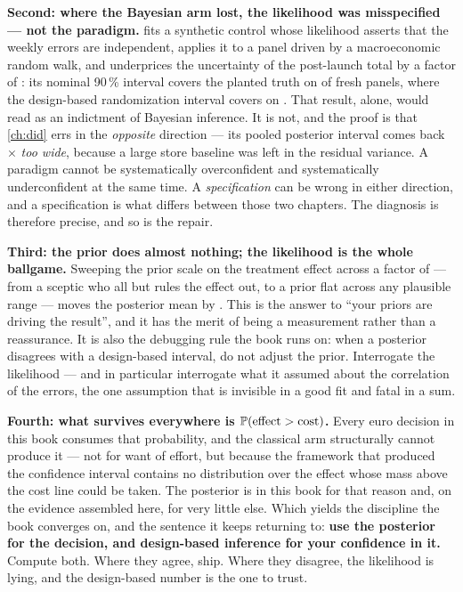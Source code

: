 \textbf{Second: where the Bayesian arm lost, the likelihood was misspecified --- not the
paradigm.}  fits a synthetic control whose likelihood asserts that the weekly
errors are independent, applies it to a panel driven by a macroeconomic random walk, and
underprices the uncertainty of the post-launch total by a factor of \nbSevenUnderprice: its
nominal 90\,\%
interval covers the planted truth on \pc{\nbSevenTotalCov} of fresh panels, where the
design-based randomization interval covers on \pc{\nbSevenRiCov}. That result, alone, would read
as an indictment of Bayesian inference. It is not, and the proof is that \cref{ch:did} errs in
the \emph{opposite} direction --- its pooled posterior interval comes back
\nbEightBayesOverCluster$\times$ \emph{too wide}, because a large store baseline was left in the
residual variance. A paradigm cannot be systematically overconfident and systematically
underconfident at the same time. A \emph{specification} can be wrong in either direction, and a
specification is what differs between those two chapters. The diagnosis is therefore precise,
and so is the repair.

\textbf{Third: the prior does almost nothing; the likelihood is the whole ballgame.} Sweeping the
prior scale on the treatment effect across a factor of \nbZeroPriorRatio{} --- from a sceptic who
all but rules the effect out, to a prior flat across any plausible range --- moves the posterior
mean by \eur{\nbZeroPriorShift}. This is the answer to ``your priors are driving the result'',
and it has the merit of being a measurement rather than a reassurance. It is also the debugging
rule the book runs on: when a posterior disagrees with a design-based interval, do not adjust the
prior. Interrogate the likelihood --- and in particular interrogate what it assumed about the
correlation of the errors, the one assumption that is invisible in a good fit and fatal in a sum.

\textbf{Fourth: what survives everywhere is $\operatorname{\mathbb{P}}(\text{effect} > \text{cost})$.} Every euro
decision in this book consumes that probability, and the classical arm structurally cannot produce
it --- not for want of effort, but because the framework that produced the confidence interval
contains no distribution over the effect whose mass above the cost line could be taken. The
posterior is in this book for that reason and, on the evidence assembled here, for very little
else. Which yields the discipline the book converges on, and the sentence it keeps returning to:
\textbf{use the posterior for the decision, and design-based inference for your confidence in it.}
Compute both. Where they agree, ship. Where they disagree, the likelihood is lying, and the
design-based number is the one to trust.


